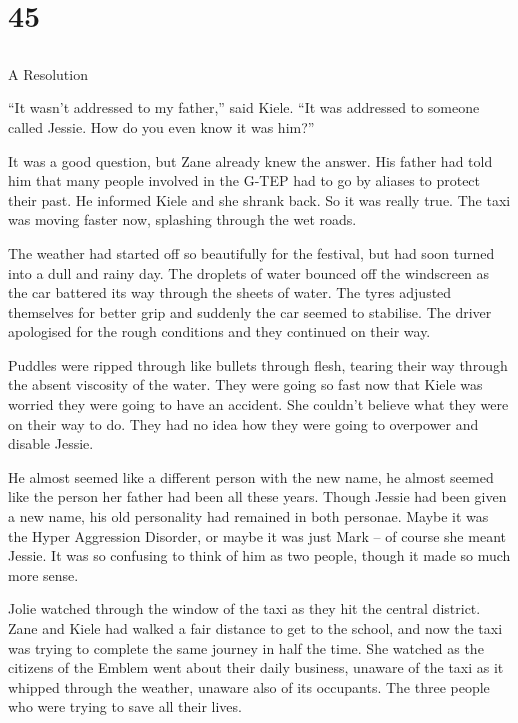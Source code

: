 \chapter{45}
\section{}
A Resolution  

``It wasn't addressed to my father,'' said Kiele.  ``It was addressed to someone called Jessie.  How do you even know it was him?''

It was a good question, but Zane already knew the answer.  His father had told him that many people involved in the G-TEP had to go by aliases to protect their past.  He informed Kiele and she shrank back.  So it was really true.  The taxi was moving faster now, splashing through the wet roads.  

The weather had started off so beautifully for the festival, but had soon turned into a dull and rainy day.  The droplets of water bounced off the windscreen as the car battered its way through the sheets of water.  The tyres adjusted themselves for better grip and suddenly the car seemed to stabilise.  The driver apologised for the rough conditions and they continued on their way.

Puddles were ripped through like bullets through flesh, tearing their way through the absent viscosity of the water.  They were going so fast now that Kiele was worried they were going to have an accident.  She couldn't believe what they were on their way to do.  They had no idea how they were going to overpower and disable Jessie.  

He almost seemed like a different person with the new name, he almost seemed like the person her father had been all these years.    Though Jessie had been given a new name, his old personality had remained in both personae.  Maybe it was the Hyper Aggression Disorder, or maybe it was just Mark – of course she meant Jessie.  It was so confusing to think of him as two people, though it made so much more sense.

Jolie watched through the window of the taxi as they hit the central district.  Zane and Kiele had walked a fair distance to get to the school, and now the taxi was trying to complete the same journey in half the time.  She watched as the citizens of the Emblem went about their daily business, unaware of the taxi as it whipped through the weather, unaware also of its occupants.  The three people who were trying to save all their lives.  

